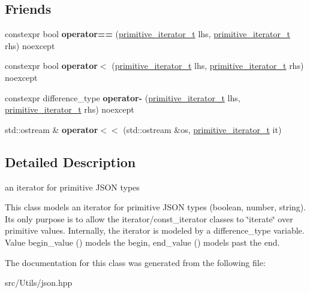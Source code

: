 \subsection*{Friends}
\begin{DoxyCompactItemize}
\item 
\mbox{\label{classnlohmann_1_1detail_1_1primitive__iterator__t_aae1e1e2ec0e229d1291d69de57d76bbe}} 
constexpr bool {\bfseries operator==} (\mbox{\hyperlink{classnlohmann_1_1detail_1_1primitive__iterator__t}{primitive\+\_\+iterator\+\_\+t}} lhs, \mbox{\hyperlink{classnlohmann_1_1detail_1_1primitive__iterator__t}{primitive\+\_\+iterator\+\_\+t}} rhs) noexcept
\item 
\mbox{\label{classnlohmann_1_1detail_1_1primitive__iterator__t_a901a95e6d73c9509d3dcde914f6c8a9d}} 
constexpr bool {\bfseries operator$<$} (\mbox{\hyperlink{classnlohmann_1_1detail_1_1primitive__iterator__t}{primitive\+\_\+iterator\+\_\+t}} lhs, \mbox{\hyperlink{classnlohmann_1_1detail_1_1primitive__iterator__t}{primitive\+\_\+iterator\+\_\+t}} rhs) noexcept
\item 
\mbox{\label{classnlohmann_1_1detail_1_1primitive__iterator__t_ac6d902d6ec9a02dabed5452d3ae78f7e}} 
constexpr difference\+\_\+type {\bfseries operator-\/} (\mbox{\hyperlink{classnlohmann_1_1detail_1_1primitive__iterator__t}{primitive\+\_\+iterator\+\_\+t}} lhs, \mbox{\hyperlink{classnlohmann_1_1detail_1_1primitive__iterator__t}{primitive\+\_\+iterator\+\_\+t}} rhs) noexcept
\item 
\mbox{\label{classnlohmann_1_1detail_1_1primitive__iterator__t_a653e8be3b4fb047e8b4460cd932f2b52}} 
std\+::ostream \& {\bfseries operator$<$$<$} (std\+::ostream \&os, \mbox{\hyperlink{classnlohmann_1_1detail_1_1primitive__iterator__t}{primitive\+\_\+iterator\+\_\+t}} it)
\end{DoxyCompactItemize}


\subsection{Detailed Description}
an iterator for primitive J\+S\+ON types 

This class models an iterator for primitive J\+S\+ON types (boolean, number, string). It\textquotesingle{}s only purpose is to allow the iterator/const\+\_\+iterator classes to \char`\"{}iterate\char`\"{} over primitive values. Internally, the iterator is modeled by a {\ttfamily difference\+\_\+type} variable. Value begin\+\_\+value ({}) models the begin, end\+\_\+value ({}) models past the end. 

The documentation for this class was generated from the following file\+:\begin{DoxyCompactItemize}
\item 
src/\+Utils/json.\+hpp\end{DoxyCompactItemize}
